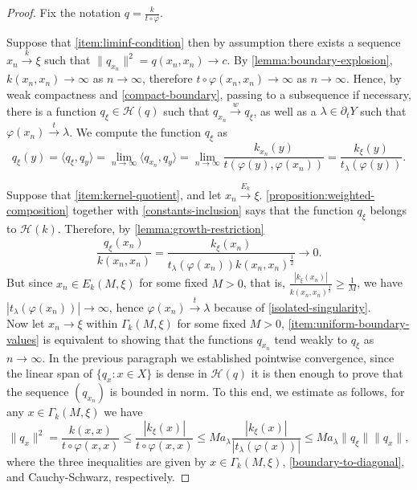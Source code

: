 \documentclass[10pt,a4paper]{amsart}
\newcommand{\Hilbert}{\mathcal{H}}
\newcommand{\la}{\langle}
\newcommand{\rand}{\partial}
\newcommand{\ra}{\rangle}
\newcommand{\xto}[1]{\stackrel{#1}{\to}}
\renewcommand{\phi}{\varphi}
\begin{document}
\begin{proof}
Fix the notation $q=\frac{k}{t\circ{\phi}}$.

Suppose that \ref{item:liminf-condition} then by assumption there exists a
sequence $x_n\xto{k}\xi$ such that $\|q_{x_n}\|^2 = q(x_n,x_n)\to c$. By
\cref{lemma:boundary-explosion}, $k(x_n,x_n)\to\infty$ as $n\to\infty$,
therefore $t\circ\phi(x_n,x_n)\to\infty$ as $n\to\infty$. Hence, by weak
compactness and \ref{compact-boundary}, passing to a subsequence if
necessary, there is a function $q_\xi\in\Hilbert(q)$ such that $q_{x_n}\xto{w}q_\xi$,
as well as a $\lambda\in\rand_tY$ such that $\phi(x_n)\xto{t}\lambda$. We
compute the function $q_\xi$ as \begin{equation}\label{equation:qxi-computation}
	q_\xi(y)
	= \la q_\xi, q_y\ra
	= \lim_{n\to\infty}\la q_{x_n}, q_y\ra
	= \lim_{n\to\infty}\frac{k_{x_n}(y)}{t(\phi(y),\phi(x_n))}
	= \frac{k_\xi(y)}{t_\lambda(\phi(y))}.
\end{equation}

Suppose that \ref{item:kernel-quotient}, and let $x_n\xto{E_k}\xi$.
\cref{proposition:weighted-composition} together with \ref{constants-inclusion}
says that the function $q_\xi$ belongs to $\Hilbert(k)$. Therefore, by \cref{lemma:growth-restriction} \[
	\frac{q_\xi(x_n)}{k(x_n,x_n)}
	= \frac{k_\xi(x_n)}{t_\lambda(\phi(x_n))k(x_n,x_n)^\frac12}
	\to 0.
\]
But since $x_n\in E_k(M,\xi)$ for some fixed $M>0$, that is,
$\frac{|k_\xi(x_n)|}{k(x_n,x_n)^\frac12}\geq\frac1M$, we have
$|t_\lambda(\phi(x_n))| \to \infty$, hence $\phi(x_n)\xto{t}\lambda$
because of \ref{isolated-singularity}.
\\ Now let $x_n\to\xi$ within $\Gamma_k(M,\xi)$ for some fixed $M>0$,
\ref{item:uniform-boundary-values} is equivalent to showing that the
functions $q_{x_n}$ tend weakly to $q_\xi$ as $n\to\infty$. In the previous
paragraph we established pointwise convergence, since the linear span of
$\{q_x:x\in X\}$ is dense in $\Hilbert(q)$ it is then enough to prove that the
sequence $(q_{x_n})$ is bounded in norm. To this end, we estimate as follows,
for any $x\in\Gamma_k(M,\xi)$ we have \begin{equation}\label{equation:c-norm-estimate}
	\|q_{x}\|^2
	= \frac{k(x,x)}{t\circ\phi(x,x)}
	\leq \frac{|k_\xi(x)|}{t\circ\phi(x,x)}
	\leq Ma_\lambda\frac{|k_\xi(x)|}{|t_\lambda(\phi(x))|}
	\leq Ma_\lambda\|q_\xi\|\|q_x\|,
\end{equation}
where the three inequalities are given by $x\in\Gamma_k(M,\xi)$,
\ref{boundary-to-diagonal}, and Cauchy-Schwarz, respectively.


\end{proof}
\end{document}
